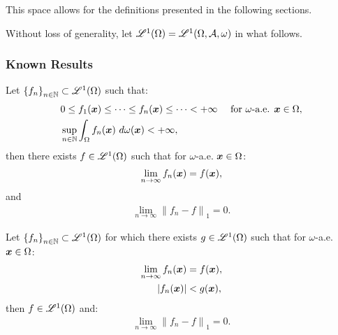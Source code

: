 This space allows for the definitions presented in the following sections.

Without loss of generality, let $\mathscr{L}^{1}(\Omega) = \mathscr{L}^{1}(\Omega, \mathcal{A}, \omega)$ in what follows.

\newpage
\subsubsection{Known Results}

\begin{theorem}
    Let $\left\{ f_n \right\}_{n \in \mathbb{N}} \subset \mathscr{L}^{1}(\Omega)$ such that:
    \begin{align}
        & 0 \leq f_1(\bm{x}) \leq \dots \leq f_n(\bm{x}) \leq \dots < +\infty &\text{ for } \omega \text{-a.e. } \bm{x} \in \Omega, \\
        & \sup_{n \in \mathbb{N}} \int_\Omega f_n(\bm{x}) ~ d \omega(\bm{x}) < +\infty,
    \end{align}
    then there exists $f \in \mathscr{L}^{1}(\Omega)$ such that for $\omega$-a.e. $\bm{x} \in \Omega$:
    \begin{align}
        \lim_{n \rightarrow \infty} f_n(\bm{x}) = f(\bm{x}),
    \end{align}
    and
    \begin{align}
        \lim_{n \rightarrow \infty} \left\lVert f_n - f \right\rVert_1 = 0.
    \end{align}
\end{theorem}

\begin{theorem}
    Let $\left\{ f_n \right\}_{n \in \mathbb{N}} \subset \mathscr{L}^{1}(\Omega)$ for which there exists $g \in \mathscr{L}^{1}(\Omega)$ such that for $\omega$-a.e. $\bm{x} \in \Omega$:
    \begin{align}
        \lim_{n \rightarrow \infty} f_n(\bm{x}) & = f(\bm{x}), \\
        \left\lvert f_n(\bm{x}) \right\rvert & < g(\bm{x}),
    \end{align}
    then $f \in \mathscr{L}^{1}(\Omega)$ and:
    \begin{align}
        \lim_{n \rightarrow \infty} \left\lVert f_n - f \right\rVert_1 = 0.
    \end{align}
\end{theorem}

